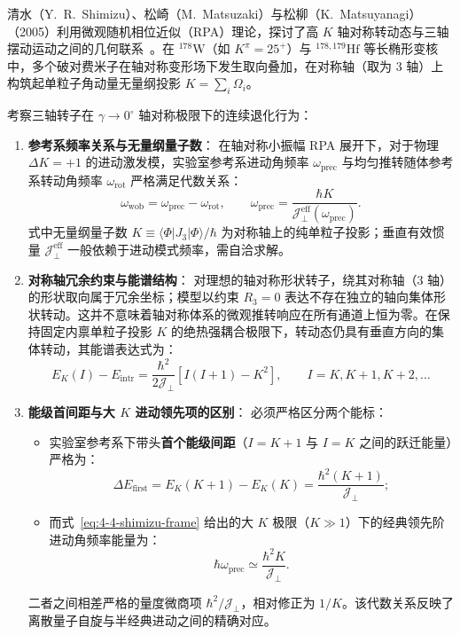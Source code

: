 清水（Y.~R.~Shimizu）、松崎（M.~Matsuzaki）与松柳（K.~Matsuyanagi）（2005）利用微观随机相位近似（RPA）理论，探讨了高 $K$ 轴对称转动态与三轴摆动运动之间的几何联系~\cite{shimizu-2005-high-k-precession}。在 $^{178}\mathrm{W}$（如 $K^\pi = 25^+$）与 $^{178,179}\mathrm{Hf}$ 等长椭形变核中，多个破对费米子在轴对称变形场下发生取向叠加，在对称轴（取为 3 轴）上构筑起单粒子角动量无量纲投影 $K = \sum_i \Omega_i$。

考察三轴转子在 $\gamma \to 0^\circ$ 轴对称极限下的连续退化行为：
\begin{enumerate}
\item \textbf{参考系频率关系与无量纲量子数}：
在轴对称小振幅 RPA 展开下，对于物理 $\Delta K = +1$ 的进动激发模，实验室参考系进动角频率 $\omega_{\mathrm{prec}}$ 与均匀推转随体参考系转动角频率 $\omega_{\mathrm{rot}}$ 严格满足代数关系：
\begin{equation}\label{eq:4-4-shimizu-frame}
\omega_{\mathrm{wob}} = \omega_{\mathrm{prec}} - \omega_{\mathrm{rot}}, \qquad
\omega_{\mathrm{prec}} = \frac{\hbar K}{\mathcal{J}_\perp^{\text{eff}}(\omega_{\mathrm{prec}})}.
\end{equation}
式中无量纲量子数 $K \equiv \langle\Phi|J_3|\Phi\rangle/\hbar$ 为对称轴上的纯单粒子投影；垂直有效惯量 $\mathcal{J}_\perp^{\text{eff}}$ 一般依赖于进动模式频率，需自洽求解。
\item \textbf{对称轴冗余约束与能谱结构}：
对理想的轴对称形状转子，绕其对称轴（3 轴）的形状取向属于冗余坐标；模型以约束 $R_3 = 0$ 表达不存在独立的轴向集体形状转动。这并不意味着轴对称体系的微观推转响应在所有通道上恒为零。在保持固定内禀单粒子投影 $K$ 的绝热强耦合极限下，转动态仍具有垂直方向的集体转动，其能谱表达式为：
\begin{equation}\label{eq:4-4-high-k-energy-formula}
E_K(I) - E_{\text{intr}} = \frac{\hbar^2}{2\mathcal{J}_\perp} \left[ I(I+1) - K^2 \right], \qquad I = K, K+1, K+2, \dots
\end{equation}
\item \textbf{能级首间距与大 $K$ 进动领先项的区别}：
必须严格区分两个能标：
\begin{itemize}
\item 实验室参考系下带头\textbf{首个能级间距}（$I=K+1$ 与 $I=K$ 之间的跃迁能量）严格为：
\begin{equation}\label{eq:4-4-first-gap}
\Delta E_{\text{first}} = E_K(K+1) - E_K(K) = \frac{\hbar^2(K+1)}{\mathcal{J}_\perp};
\end{equation}
\item 而式~\eqref{eq:4-4-shimizu-frame} 给出的大 $K$ 极限（$K \gg 1$）下的经典领先阶进动角频率能量为：
\begin{equation}\label{eq:4-4-asymptotic-prec}
\hbar\omega_{\mathrm{prec}} \simeq \frac{\hbar^2 K}{\mathcal{J}_\perp}.
\end{equation}
\end{itemize}
二者之间相差严格的量度微商项 $\hbar^2/\mathcal{J}_\perp$，相对修正为 $1/K$。该代数关系反映了离散量子自旋与半经典进动之间的精确对应。
\end{enumerate}

